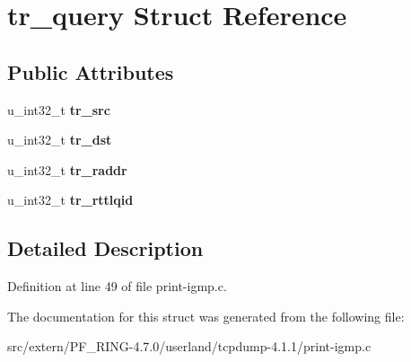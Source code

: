 \hypertarget{structtr__query}{
\section{tr\_\-query Struct Reference}
\label{structtr__query}
}
\subsection*{Public Attributes}
\begin{DoxyCompactItemize}
\item 
\hypertarget{structtr__query_a80c19b8e065c6fb6d563d84e4197cd00}{
u\_\-int32\_\-t {\bfseries tr\_\-src}}
\label{structtr__query_a80c19b8e065c6fb6d563d84e4197cd00}

\item 
\hypertarget{structtr__query_aaf19b5b0a71e3ad0dae12d6b27ee477e}{
u\_\-int32\_\-t {\bfseries tr\_\-dst}}
\label{structtr__query_aaf19b5b0a71e3ad0dae12d6b27ee477e}

\item 
\hypertarget{structtr__query_a3d38d0fd87a545391661988c516f2fb3}{
u\_\-int32\_\-t {\bfseries tr\_\-raddr}}
\label{structtr__query_a3d38d0fd87a545391661988c516f2fb3}

\item 
\hypertarget{structtr__query_a16cf00aa070f22f82dcb9b75cfccf5f4}{
u\_\-int32\_\-t {\bfseries tr\_\-rttlqid}}
\label{structtr__query_a16cf00aa070f22f82dcb9b75cfccf5f4}

\end{DoxyCompactItemize}


\subsection{Detailed Description}


Definition at line 49 of file print-\/igmp.c.



The documentation for this struct was generated from the following file:\begin{DoxyCompactItemize}
\item 
src/extern/PF\_\-RING-\/4.7.0/userland/tcpdump-\/4.1.1/print-\/igmp.c\end{DoxyCompactItemize}
